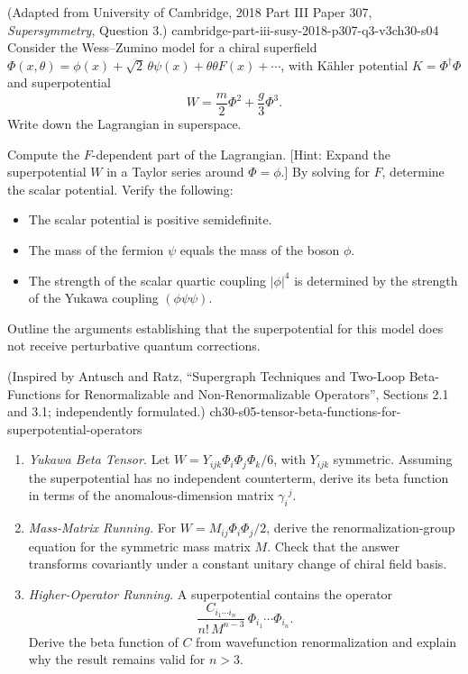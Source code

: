 \begin{enumerate}
    {(Adapted from University of Cambridge, 2018 Part III Paper 307, \emph{Supersymmetry}, Question 3.)}
    {cambridge-part-iii-susy-2018-p307-q3-v3ch30-s04}
  Consider the Wess--Zumino model for a chiral superfield
  \(\Phi(x,\theta)=\phi(x)+\sqrt2\,\theta\psi(x)+\theta\theta F(x)+\cdots\),
  with K\"ahler potential \(K=\Phi^\dagger\Phi\) and superpotential
  \[
    W=\frac{m}{2}\Phi^2+\frac{g}{3}\Phi^3.
  \]
  Write down the Lagrangian in superspace.

  Compute the \(F\)-dependent part of the Lagrangian.  [Hint: Expand the
  superpotential \(W\) in a Taylor series around \(\Phi=\phi\).]  By solving
  for \(F\), determine the scalar potential.  Verify the following:
  \begin{itemize}
    \item The scalar potential is positive semidefinite.
    \item The mass of the fermion \(\psi\) equals the mass of the boson
      \(\phi\).
    \item The strength of the scalar quartic coupling \(|\phi|^4\) is
      determined by the strength of the Yukawa coupling \((\phi\psi\psi)\).
  \end{itemize}
  Outline the arguments establishing that the superpotential for this model
  does not receive perturbative quantum corrections.

    {(Inspired by Antusch and Ratz, ``Supergraph Techniques and Two-Loop Beta-Functions for Renormalizable and Non-Renormalizable Operators'', Sections 2.1 and 3.1; independently formulated.)}
    {ch30-s05-tensor-beta-functions-for-superpotential-operators}
  \begin{enumerate}
    \item \emph{Yukawa Beta Tensor.}
    Let \(W=Y_{ijk}\Phi_i\Phi_j\Phi_k/6\), with \(Y_{ijk}\) symmetric.
      Assuming the superpotential has no independent counterterm, derive
      its beta function in terms of the anomalous-dimension matrix
      \(\gamma_i{}^j\).
    \item \emph{Mass-Matrix Running.}
    For \(W=M_{ij}\Phi_i\Phi_j/2\), derive the renormalization-group
      equation for the symmetric mass matrix \(M\).  Check that the answer
      transforms covariantly under a constant unitary change of chiral
      field basis.
    \item \emph{Higher-Operator Running.}
    A superpotential contains the operator
      \[
        \frac{C_{i_1\cdots i_n}}{n!\,M^{n-3}}\,
          \Phi_{i_1}\cdots\Phi_{i_n}.
      \]
      Derive the beta function of \(C\) from wavefunction renormalization
      and explain why the result remains valid for \(n>3\).
  \end{enumerate}


\end{enumerate}
